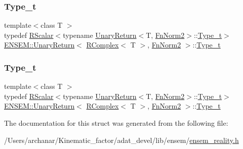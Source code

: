\subsubsection{\texorpdfstring{Type\_t}{Type\_t}\hspace{0.1cm}{\footnotesize\ttfamily [1/2]}}
{\footnotesize\ttfamily template$<$class T $>$ \\
typedef \mbox{\hyperlink{classENSEM_1_1RScalar}{R\+Scalar}}$<$typename \mbox{\hyperlink{structENSEM_1_1UnaryReturn}{Unary\+Return}}$<$T, \mbox{\hyperlink{structENSEM_1_1FnNorm2}{Fn\+Norm2}}$>$\+::\mbox{\hyperlink{structENSEM_1_1UnaryReturn_3_01RComplex_3_01T_01_4_00_01FnNorm2_01_4_a6b6070508bed1e14a03db04ab901526a}{Type\+\_\+t}}$>$ \mbox{\hyperlink{structENSEM_1_1UnaryReturn}{E\+N\+S\+E\+M\+::\+Unary\+Return}}$<$ \mbox{\hyperlink{classENSEM_1_1RComplex}{R\+Complex}}$<$ T $>$, \mbox{\hyperlink{structENSEM_1_1FnNorm2}{Fn\+Norm2}} $>$\+::\mbox{\hyperlink{structENSEM_1_1UnaryReturn_3_01RComplex_3_01T_01_4_00_01FnNorm2_01_4_a6b6070508bed1e14a03db04ab901526a}{Type\+\_\+t}}}

\mbox{\label{structENSEM_1_1UnaryReturn_3_01RComplex_3_01T_01_4_00_01FnNorm2_01_4_a6b6070508bed1e14a03db04ab901526a}} 
\subsubsection{\texorpdfstring{Type\_t}{Type\_t}\hspace{0.1cm}{\footnotesize\ttfamily [2/2]}}
{\footnotesize\ttfamily template$<$class T $>$ \\
typedef \mbox{\hyperlink{classENSEM_1_1RScalar}{R\+Scalar}}$<$typename \mbox{\hyperlink{structENSEM_1_1UnaryReturn}{Unary\+Return}}$<$T, \mbox{\hyperlink{structENSEM_1_1FnNorm2}{Fn\+Norm2}}$>$\+::\mbox{\hyperlink{structENSEM_1_1UnaryReturn_3_01RComplex_3_01T_01_4_00_01FnNorm2_01_4_a6b6070508bed1e14a03db04ab901526a}{Type\+\_\+t}}$>$ \mbox{\hyperlink{structENSEM_1_1UnaryReturn}{E\+N\+S\+E\+M\+::\+Unary\+Return}}$<$ \mbox{\hyperlink{classENSEM_1_1RComplex}{R\+Complex}}$<$ T $>$, \mbox{\hyperlink{structENSEM_1_1FnNorm2}{Fn\+Norm2}} $>$\+::\mbox{\hyperlink{structENSEM_1_1UnaryReturn_3_01RComplex_3_01T_01_4_00_01FnNorm2_01_4_a6b6070508bed1e14a03db04ab901526a}{Type\+\_\+t}}}



The documentation for this struct was generated from the following file\+:\begin{DoxyCompactItemize}
\item 
/\+Users/archanar/\+Kinematic\+\_\+factor/adat\+\_\+devel/lib/ensem/\mbox{\hyperlink{lib_2ensem_2ensem__reality_8h}{ensem\+\_\+reality.\+h}}\end{DoxyCompactItemize}
